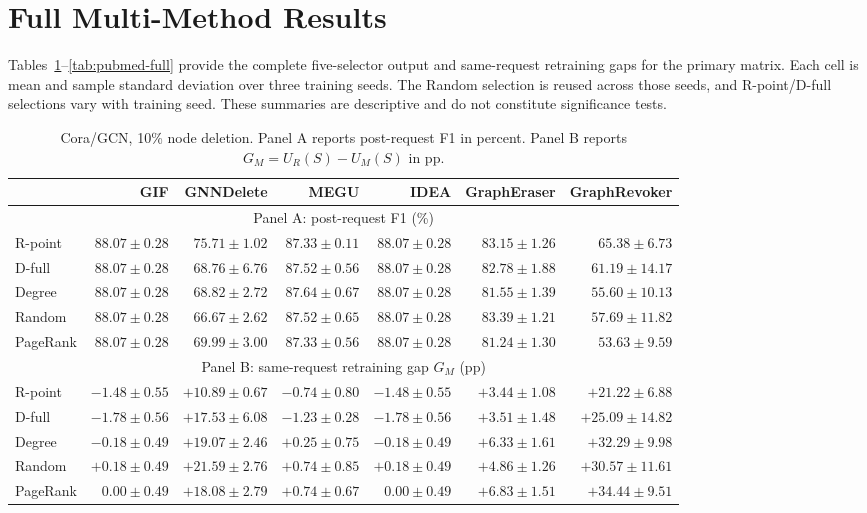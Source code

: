 

\section{Full Multi-Method Results}
\label{app:full-matrix}

Tables~\ref{tab:cora-full}--\ref{tab:pubmed-full} provide the complete five-selector output and same-request retraining gaps for the primary matrix. Each cell is mean and sample standard deviation over three training seeds. The Random selection is reused across those seeds, and R-point/D-full selections vary with training seed. These summaries are descriptive and do not constitute significance tests.

\begin{table}[t]
\centering
\scriptsize
\setlength{\tabcolsep}{4pt}
\caption{Cora/GCN, 10\% node deletion. Panel A reports post-request F1 in percent. Panel B reports $G_M=U_R(S)-U_M(S)$ in pp.}
\label{tab:cora-full}
\begin{tabular}{lrrrrrr}
\toprule
 & GIF & GNNDelete & MEGU & IDEA & GraphEraser & GraphRevoker \\
\midrule
\multicolumn{7}{c}{Panel A: post-request F1 (\%)} \\
\midrule
R-point & $88.07\pm0.28$ & $75.71\pm1.02$ & $87.33\pm0.11$ & $88.07\pm0.28$ & $83.15\pm1.26$ & $65.38\pm6.73$ \\
D-full & $88.07\pm0.28$ & $68.76\pm6.76$ & $87.52\pm0.56$ & $88.07\pm0.28$ & $82.78\pm1.88$ & $61.19\pm14.17$ \\
Degree & $88.07\pm0.28$ & $68.82\pm2.72$ & $87.64\pm0.67$ & $88.07\pm0.28$ & $81.55\pm1.39$ & $55.60\pm10.13$ \\
Random & $88.07\pm0.28$ & $66.67\pm2.62$ & $87.52\pm0.65$ & $88.07\pm0.28$ & $83.39\pm1.21$ & $57.69\pm11.82$ \\
PageRank & $88.07\pm0.28$ & $69.99\pm3.00$ & $87.33\pm0.56$ & $88.07\pm0.28$ & $81.24\pm1.30$ & $53.63\pm9.59$ \\
\midrule
\multicolumn{7}{c}{Panel B: same-request retraining gap $G_M$ (pp)} \\
\midrule
R-point & $-1.48\pm0.55$ & $+10.89\pm0.67$ & $-0.74\pm0.80$ & $-1.48\pm0.55$ & $+3.44\pm1.08$ & $+21.22\pm6.88$ \\
D-full & $-1.78\pm0.56$ & $+17.53\pm6.08$ & $-1.23\pm0.28$ & $-1.78\pm0.56$ & $+3.51\pm1.48$ & $+25.09\pm14.82$ \\
Degree & $-0.18\pm0.49$ & $+19.07\pm2.46$ & $+0.25\pm0.75$ & $-0.18\pm0.49$ & $+6.33\pm1.61$ & $+32.29\pm9.98$ \\
Random & $+0.18\pm0.49$ & $+21.59\pm2.76$ & $+0.74\pm0.85$ & $+0.18\pm0.49$ & $+4.86\pm1.26$ & $+30.57\pm11.61$ \\
PageRank & $0.00\pm0.49$ & $+18.08\pm2.79$ & $+0.74\pm0.67$ & $0.00\pm0.49$ & $+6.83\pm1.51$ & $+34.44\pm9.51$ \\
\bottomrule
\end{tabular}
\end{table}

